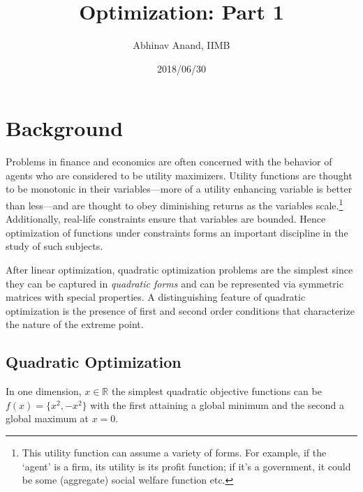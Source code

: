 \documentclass[11pt,]{article}
\title{Optimization: Part 1}
\author{Abhinav Anand, IIMB}
\date{2018/06/30}
\let\rmarkdownfootnote\footnote%
\def\footnote{\protect\rmarkdownfootnote}
\begin{document}
\maketitle

\section{Background}\label{background}

Problems in finance and economics are often concerned with the behavior
of agents who are considered to be utility maximizers. Utility functions
are thought to be monotonic in their variables---more of a utility
enhancing variable is better than less---and are thought to obey
diminishing returns as the variables scale.\footnote{This utility
  function can assume a variety of forms. For example, if the `agent' is
  a firm, its utility is its profit function; if it's a government, it
  could be some (aggregate) social welfare function etc.} Additionally,
real-life constraints ensure that variables are bounded. Hence
optimization of functions under constraints forms an important
discipline in the study of such subjects.

After linear optimization, quadratic optimization problems are the
simplest since they can be captured in \emph{quadratic forms} and can be
represented via symmetric matrices with special properties. A
distinguishing feature of quadratic optimization is the presence of
first and second order conditions that characterize the nature of the
extreme point.

\subsection{Quadratic Optimization}\label{quadratic-optimization}

In one dimension, \(x\in \mathbb{R}\) the simplest quadratic objective
functions can be \(f(x)=\{x^2, -x^2\}\) with the first attaining a
global minimum and the second a global maximum at \(x=0\).
\end{document}
